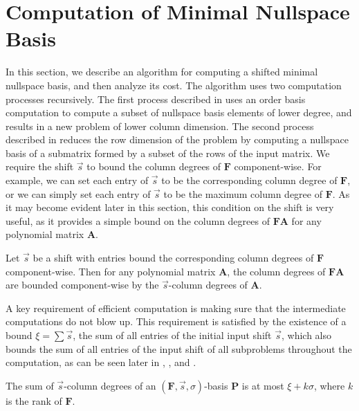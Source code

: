 
\section{Computation of Minimal Nullspace Basis}

\label{sec:Nullspace-Basis-Computation}

In this section, we describe an algorithm for computing a shifted
minimal nullspace basis, and then analyze its cost. The algorithm
uses two computation processes recursively. The first process described
in  uses
an order basis computation to compute a subset of nullspace basis
elements of lower degree, and results in a new problem of lower column
dimension. The second process described in 
reduces the row dimension of the problem by computing a nullspace
basis of a submatrix formed by a subset of the rows of the input matrix.
We require the shift $\vec{s}$ to bound the column degrees of $\mathbf{F}$
component-wise. For example, we can set each entry of $\vec{s}$ to
be the corresponding column degree of $\mathbf{F}$, or we can simply
set each entry of $\vec{s}$ to be the maximum column degree of $\mathbf{F}$.
As it may become evident later in this section, this condition on
the shift is very useful, as it provides a simple bound on the column
degrees of $\mathbf{F}\mathbf{A}$ for any polynomial matrix $\mathbf{A}$.
\begin{lem}
\label{lem:boundOnDegreesOfFA}Let $\vec{s}$ be a shift with entries
bound the corresponding column degrees of $\mathbf{F}$ component-wise.
Then for any polynomial matrix $\mathbf{A}$, the column degrees of
$\mathbf{FA}$ are bounded component-wise by the $\vec{s}$-column
degrees of $\mathbf{A}$.
\end{lem}
A key requirement of efficient computation is making sure that the
intermediate computations do not blow up. This requirement is satisfied
by the existence of a bound $\xi=\sum\vec{s}$, the sum of all entries
of the initial input shift $\vec{s}$, which also bounds the sum of
all entries of the input shift of all subproblems throughout the computation,
as can be seen later in ,
, and .
\begin{lem}
\label{lem:boundOfSumOfShiftedDegreesOfOrderBasis}The sum of $\vec{s}$-column
degrees of an $(\mathbf{F},\vec{s},\sigma)$-basis $\mathbf{P}$ is
at most $\xi+k\sigma$, where $k$ is the rank of $\mathbf{F}$.\end{lem}
